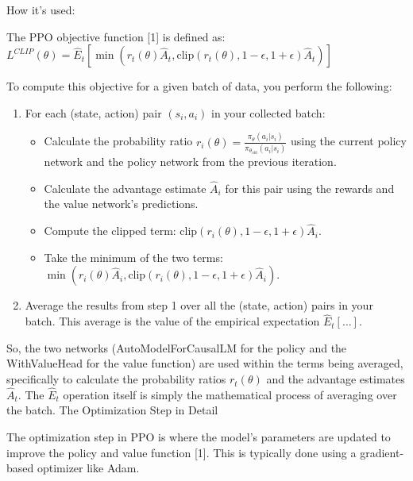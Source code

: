 \documentclass[10pt,a4paper]{report}
\begin{document}
How it's used:

The PPO objective function [1] is defined as: $L^{CLIP}(\theta) = \hat{E}_t [\min(r_t(\theta) \hat{A}_t, \text{clip}(r_t(\theta), 1-\epsilon, 1+\epsilon) \hat{A}_t)]$

To compute this objective for a given batch of data, you perform the following:
\begin{enumerate}
\item    For each (state, action) pair $(s_i, a_i)$ in your collected batch:
\begin{itemize}
\item        Calculate the probability ratio $r_i(\theta) = \frac{\pi_\theta(a_i|s_i)}{\pi_{\theta_{\text{old}}}(a_i|s_i)}$ using the current policy network and the policy network from the previous iteration.
\item        Calculate the advantage estimate $\hat{A}_i$ for this pair using the rewards and the value network's predictions.
\item        Compute the clipped term: $\text{clip}(r_i(\theta), 1-\epsilon, 1+\epsilon) \hat{A}_i$.
 \item       Take the minimum of the two terms: $\min(r_i(\theta) \hat{A}_i, \text{clip}(r_i(\theta), 1-\epsilon, 1+\epsilon) \hat{A}_i)$.       
\end{itemize}

\item    Average the results from step 1 over all the (state, action) pairs in your batch. This average is the value of the empirical expectation $\hat{E}_t [\dots]$.
\end{enumerate}

So, the two networks (AutoModelForCausalLM for the policy and the WithValueHead for the value function) are used within the terms being averaged, specifically to calculate the probability ratios $r_t(\theta)$ and the advantage estimates $\hat{A}_t$. The $\hat{E}_t$ operation itself is simply the mathematical process of averaging over the batch.
The Optimization Step in Detail

The optimization step in PPO is where the model's parameters are updated to improve the policy and value function [1]. This is typically done using a gradient-based optimizer like Adam.
\end{document}
